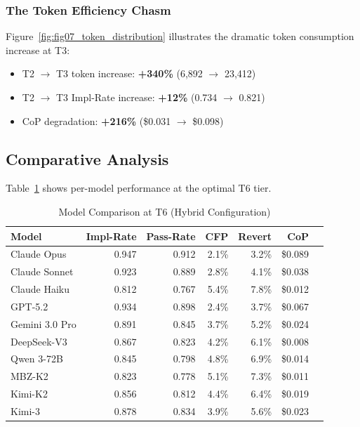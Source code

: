 \documentclass[11pt]{article}
\begin{document}
\subsubsection{The Token Efficiency Chasm}
Figure~\ref{fig:fig07_token_distribution} illustrates the dramatic token consumption increase at T3:
\begin{itemize}
    \item T2 $\rightarrow$ T3 token increase: \textbf{+340\%} (6,892 $\rightarrow$ 23,412)
    \item T2 $\rightarrow$ T3 Impl-Rate increase: \textbf{+12\%} (0.734 $\rightarrow$ 0.821)
    \item CoP degradation: \textbf{+216\%} (\$0.031 $\rightarrow$ \$0.098)
\end{itemize}

\subsection{Comparative Analysis}

Table~\ref{tab:model-comparison} shows per-model performance at the optimal T6 tier.

\begin{table}[H]
\centering
\caption{Model Comparison at T6 (Hybrid Configuration)}
\label{tab:model-comparison}
\begin{tabular}{lrrrrrr}
\toprule
\textbf{Model} & \textbf{Impl-Rate} & \textbf{Pass-Rate} & \textbf{CFP} & \textbf{Revert} & \textbf{CoP} \\
\midrule
Claude Opus & 0.947 & 0.912 & 2.1\% & 3.2\% & \$0.089 \\
Claude Sonnet & 0.923 & 0.889 & 2.8\% & 4.1\% & \$0.038 \\
Claude Haiku & 0.812 & 0.767 & 5.4\% & 7.8\% & \$0.012 \\
GPT-5.2 & 0.934 & 0.898 & 2.4\% & 3.7\% & \$0.067 \\
Gemini 3.0 Pro & 0.891 & 0.845 & 3.7\% & 5.2\% & \$0.024 \\
DeepSeek-V3 & 0.867 & 0.823 & 4.2\% & 6.1\% & \$0.008 \\
Qwen 3-72B & 0.845 & 0.798 & 4.8\% & 6.9\% & \$0.014 \\
MBZ-K2 & 0.823 & 0.778 & 5.1\% & 7.3\% & \$0.011 \\
Kimi-K2 & 0.856 & 0.812 & 4.4\% & 6.4\% & \$0.019 \\
Kimi-3 & 0.878 & 0.834 & 3.9\% & 5.6\% & \$0.023 \\
\bottomrule
\end{tabular}
\end{table}
\end{document}

